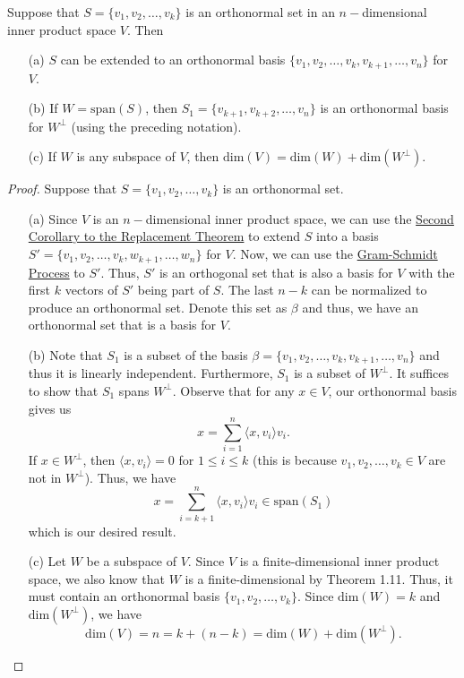 \begin{theorem}\label{Theorem 6.7}
   Suppose that \( S = \{ {v}_{1}, {v}_{2}, \dots, {v}_{k } \}  \) is an orthonormal set in an \( n- \)dimensional inner product space \( V  \). Then 
   \begin{enumerate}
       \item[(a)] \( S  \) can be extended to an orthonormal basis \( \{ {v}_{1}, {v}_{2}, \dots, {v}_{k}, {v}_{k+1}, \dots, {v}_{n} \}  \) for \( V  \).
        \item[(b)] If \( W = \text{span}(S)  \), then \( {S}_{1} = \{ {v}_{k+1}, {v}_{k+2}, \dots, {v}_{n} \}  \) is an orthonormal basis for \( W^{\perp} \) (using the preceding notation).
        \item[(c)] If \( W  \) is any subspace of  \( V  \), then \( \text{dim}(V) = \text{dim}(W) + \text{dim}(W^{\perp}) \).
   \end{enumerate}
\end{theorem}
\begin{proof} Suppose that \( S = \{ {v}_{1}, {v}_{2}, \dots, {v}_{k} \}   \) is an orthonormal set.
\begin{enumerate}
    \item[(a)] Since \( V  \) is an \( n- \)dimensional inner product space, we can use the {\hyperref[2nd Corollary to RT]{Second Corollary to the Replacement Theorem}} to extend \( S  \) into a basis \( S' = \{ {v}_{1}, {v}_{2}, \dots, {v}_{k}, {w}_{k+1}, \dots, {w}_{n} \}  \) for \( V  \). Now, we can use the {\hyperref[Theorem 6.4]{Gram-Schmidt Process}} to \( S' \). Thus, \( S'  \) is an orthogonal set that is also a basis for \( V  \) with the first \( k  \) vectors of \( S' \) being part of \( S  \). The last \( n  - k  \) can be normalized to produce an orthonormal set. Denote this set as \( \beta \) and thus, we have an orthonormal set that is a basis for \( V  \).
    \item[(b)] Note that \( {S}_{1} \) is a subset of the basis \( \beta = \{ {v}_{1}, {v}_{2}, \dots, {v}_{k }, {v}_{k+1}, \dots, {v}_{n} \}  \) and thus it is linearly independent. Furthermore, \( {S}_{1} \) is a subset of \( W^{\perp} \). It suffices to show that \( {S}_{1} \) spans \( W^{\perp}\). Observe that for any \( x \in V  \), our orthonormal basis gives us
        \[ x  = \sum_{ i=1  }^{ n } \langle x , {v}_{i}  \rangle {v}_{i}.  \]
        If \( x \in W^{\perp} \), then \( \langle x , {v}_{i} \rangle = 0  \) for \( 1 \leq i \leq k  \) (this is because \( {v}_{1}, {v}_{2}, \dots, {v}_{k} \in V  \) are not in \( W^{\perp} \)). Thus, we have
        \[  x = \sum_{ i= k + 1  }^{ n } \langle x , {v}_{i} \rangle {v}_{i} \in \text{span}({S}_{1}) \]
        which is our desired result.
    \item[(c)] Let \( W  \) be a subspace of \( V \). Since \( V  \) is a finite-dimensional inner product space, we also know that \( W  \) is a finite-dimensional by Theorem 1.11. Thus, it must contain an orthonormal basis \( \{ {v}_{1}, {v}_{2}, \dots, {v}_{k } \}  \). Since \( \text{dim}(W) = k  \) and \( \text{dim}(W^{\perp})  \), we have  
        \[  \text{dim}(V) = n = k + (n-k) = \text{dim}(W) + \text{dim}(W^{\perp}). \]
\end{enumerate}
\end{proof}

